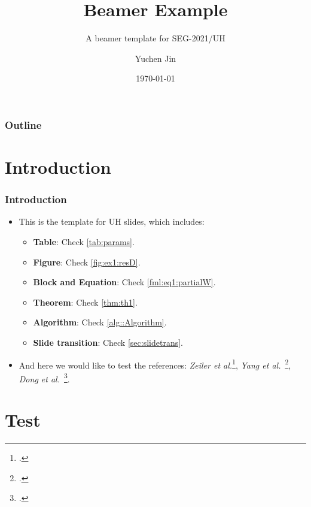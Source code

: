 \documentclass[aspectratio=169,hyperref={implicit=true}]{beamer}
\title[Demo]{Beamer Example}
\author{Yuchen Jin}
\subtitle{A beamer template for SEG-2021/UH}
\date{\today}
\institute[Department of ECE]{University of Houston\\Department of ECE}
\begin{document}
\titleframe

\begin{frame}
    \frametitle{Outline}
    \tableofcontents[currentsection]
\end{frame}

\section{Introduction}
\begin{frame}
\frametitle{Introduction}
  \begin{itemize}
    \item This is the template for UH slides, which includes:
    \begin{itemize}
      \item \textbf{Table}: Check \cref{tab:params}.
      \item \textbf{Figure}: Check \cref{fig:ex1:resD}.
      \item \textbf{Block and Equation}: Check \eqref{fml:eq1:partialW}.
      \item \textbf{Theorem}: Check \cref{thm:th1}.
      \item \textbf{Algorithm}: Check \cref{alg::Algorithm}.
      \item \textbf{Slide transition}: Check \cref{sec:slidetrans}.
    \end{itemize}
    \item And here we would like to test the references: \textit{Zeiler et al.}\footcite{Zeiler5539957}, \textit{Yang et al.}~\footcite{Yang6175956}, \textit{Dong et al.}~\footcite{Dong7115171}.
  \end{itemize}
\end{frame}

\section{Test}
\end{document}
